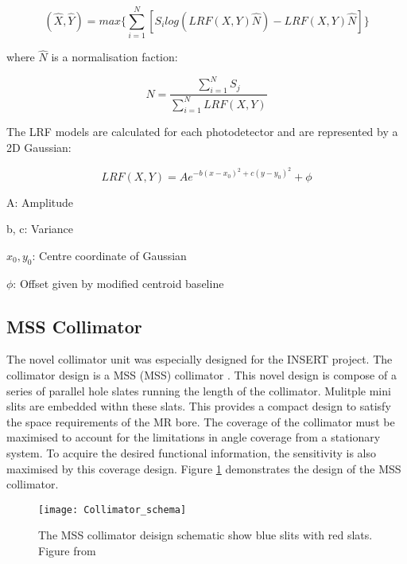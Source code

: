 \begin{equation} \label{eqn:PERA}
                (\hat{X},\hat{Y}) = max\{ \sum^{N}_{i=1} [ S_{i}log(LRF(X,Y) \hat{N}) - LRF(X,Y) \hat{N} ] \}
\end{equation}

where $\hat{N}$ is a normalisation faction:

\begin{equation} \label{eqn:Norm}
                \hat{N} = \frac{\sum^{N}_{i=1} S_{j}}{\sum^{N}_{i=1} LRF(X,Y)}
\end{equation}

The \acrshort{LRF} models are calculated for each photodetector and are represented by a 2D Gaussian: 

\begin{equation} \label{eqn:LRF}
    LRF(X,Y) = Ae^{-b(x-x_{0})^{2} + c(y-y_{0})^2} + \phi
\end{equation}

\begin{description}
    \item{A}: Amplitude
    \vspace{-0.5cm}
    \item{b, c}: Variance
    \vspace{-0.5cm}
    \item{$x_{0}, y_{0}$}: Centre coordinate of Gaussian
   \vspace{-0.5cm}
    \item{$\phi$}: Offset given by modified centroid baseline
\end{description}

\subsection{MSS Collimator}
The novel collimator unit was especially designed for the INSERT project. The collimator design is a \acrlong{MSS} (\acrshort{MSS}) collimator \cite{7181734}. This novel design is compose of a series of parallel hole slates running the length of the collimator. Mulitple mini slits are embedded withn these slats. This provides a compact design to satisfy the space requirements of the \acrshort{MR} bore. The coverage of the collimator must be maximised to account for the limitations in angle coverage from a stationary system. To acquire the desired functional information, the sensitivity is also maximised by this coverage design. Figure \ref{fig:MSSColl} demonstrates the design of the MSS collimator.


\begin{figure}[htp]
    \centering
    \texttt{[image: Collimator\_schema]} %
    \caption{The MSS collimator deisign schematic show blue slits with red slats. Figure from \cite{8069508}} \label{fig:MSSColl}
\end{figure}

